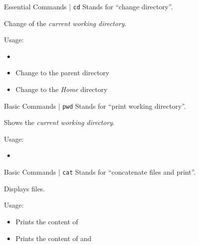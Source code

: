 \documentclass{setbeamer}
\begin{document}
\begin{frame}{Essential Commands | \texttt{cd}}
    Stands for ``change directory''.

    \vspace{0.3cm}

    Change of the \emph{current working directory}.

    \vspace{0.3cm}

    Usage:
    \begin{itemize}
        \item {}
        \item {}\textemdash Change to the parent directory
        \item {}\textemdash Change to the \emph{Home} directory
    \end{itemize}
\end{frame}

\begin{frame}{Basic Commands | \texttt{pwd}}
    Stands for ``print working directory''.

    \vspace{0.3cm}

    Shows the \emph{current working directory}.

    \vspace{0.3cm}

    Usage:
    \begin{itemize}
        \item {}
    \end{itemize}
\end{frame}

\begin{frame}{Basic Commands | \texttt{cat}}
    Stands for ``concatenate files and print''.

    \vspace{0.3cm}

    Displays files.

    \vspace{0.3cm}

    Usage:
    \begin{itemize}
        \item {}\textemdash Prints the content of 
        \item {}\textemdash Prints the content of  and 
    \end{itemize}
\end{frame}
\end{document}
